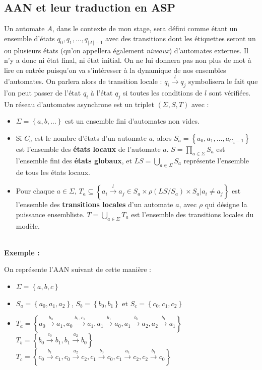 \documentclass[12pt,a4paper]{article}
\begin{document}
\subsection{AAN et leur traduction en ASP}
Un automate $A$, dans le contexte de mon stage, sera défini comme étant un ensemble d'états $q_0, q_1, ..., q_{|A|-1}$ avec des transitions dont les étiquettes seront un ou plusieurs états (qu'on appellera également \emph{niveaux}) 
d'automates externes. Il n'y a donc ni état final, ni état initial. On ne lui donnera pas non plus de mot à lire en entrée puisqu'on va s'intéresser à la dynamique de nos ensembles d'automates. On parlera alors de 
transition locale : $q_i\xrightarrow{l}q_j$ symbolisera le fait que l'on peut passer de l'état $q_i$ à l'état $q_j$ si toutes les conditions de $l$ sont vérifiées.\\
Un réseau d'automates asynchrone est un triplet $(\Sigma,S,T)$ avec :
\begin{itemize}
	\item $\Sigma=\left\{a,b,...\right\}$ est un ensemble fini d'automates non vides.
	\item Si $C_a$ est le nombre d'états d'un automate $a$, alors $S_a=\left\{a_0,a_1,...,a_{C_a-1}\right\}$ est l'ensemble des \textbf{états locaux} de l'automate $a$. $S=\displaystyle{\prod_{a\in\Sigma}}S_a$ est l'ensemble 
	fini des \textbf{états globaux}, et $LS=\displaystyle{\bigcup_{a\in\Sigma}}S_a$ représente l'ensemble de tous les états locaux.
	\item Pour chaque $a\in\Sigma$, $T_a\subseteq\left\{a_i\xrightarrow{l}a_j\in S_a\times\rho(LS/S_a)\times S_a|a_i\neq a_j\right\}$ est l'ensemble des \textbf{transitions locales} d'un automate $a$, avec 
	$\rho$ qui désigne la puissance ensembliste. $T=\displaystyle{\bigcup_{a\in\Sigma}}T_a$ est l'ensemble des transitions locales du modèle.\\ \\
\end{itemize}
\hypertarget{exemple}{\textbf{Exemple :}} On représente l'AAN suivant de cette manière :
\begin{itemize}
	\item $\Sigma =\left\{a,b,c\right\}$
	\item $S_a=\left\{a_0,a_1,a_2\right\}$, $S_b=\left\{b_0,b_1\right\}$ et $S_c=\left\{c_0,c_1,c_2\right\}$
	\item $T_a = \left\{a_0\xrightarrow{b_0}a_1,a_0\xrightarrow{b_1,c_1}a_1,a_1\xrightarrow{b_1}a_0,a_1\xrightarrow{b_0}a_2,a_2\xrightarrow{b_1}a_1\right\}$\\
	$T_b=\left\{b_0\xrightarrow{c_0}b_1,b_1\xrightarrow{a_2}b_0\right\}$\\
	$T_c=\left\{c_0\xrightarrow{b_1}c_1,c_0\xrightarrow{a_2}c_2,c_1\xrightarrow{b_0}c_0,c_1\xrightarrow{a_1}c_2,c_2\xrightarrow{b_1}c_0\right\}$
\end{itemize}
\end{document}
